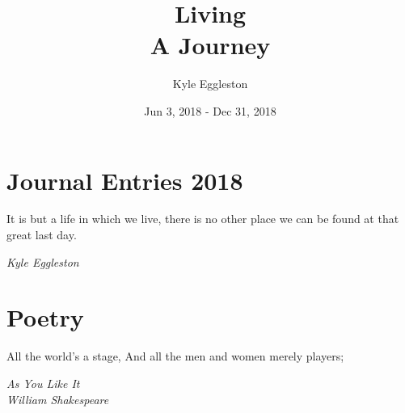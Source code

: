 \documentclass{book}
\title{%
  Living \\
  \large A Journey}
\author{Kyle Eggleston}
\date{Jun 3, 2018 - Dec 31, 2018}
\begin{document}
\maketitle
\thispagestyle{empty}

\frontmatter

\tableofcontents

\listoftables

\listoffigures

\newpage



\mainmatter

\chapter{Journal Entries 2018}
\epigraph{It is but a life in which we live, there is no other place we can be
found at that great last day.}{\textit{Kyle Eggleston}}


\chapter{Poetry}
\epigraph{All the world’s a stage, And all the men and women merely players;}
{\textit{As You Like It \\ William Shakespeare}}


\backmatter
\printbibliography
\end{document}
